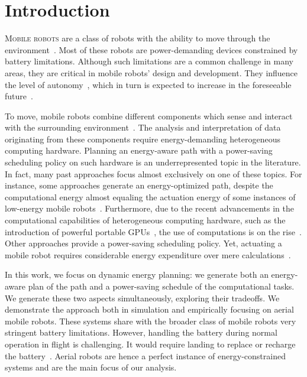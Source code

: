 
\chapter{Introduction}
\label{cp:intro}


\lettrine{M}{obile robots} are a class of robots with the ability to move through the environment~\citep{corke2017robotics}. Most of these robots are power-demanding devices constrained by battery limitations. Although such limitations are a common challenge in many areas, they are critical in mobile robots' design and development. They influence the level of autonomy~\citep{seewald2020mechanical}, which in turn is expected to increase in the foreseeable future~\citep{fisher2013verifying}.

To move, mobile robots combine different components which sense and interact with the surrounding environment~\citep{mei2006deployment}. The analysis and interpretation of data originating from these components require energy-demanding heterogeneous computing hardware. Planning an energy-aware path with a power-saving scheduling policy on such hardware is an underrepresented topic in the literature. In fact, many past approaches focus almost exclusively on one of these topics. For instance, some approaches generate an energy-optimized path, despite the computational energy almost equaling the actuation energy of some instances of low-energy mobile robots~\citep{sudhakar2020balancing}. Furthermore, due to the recent advancements in the computational capabilities of heterogeneous computing hardware, such as the introduction of powerful portable GPUs~\citep{rizvi2017general}, the use of computations is on the rise~\citep{abramov2012real,satria2016real,jaramillo2019visual}. Other approaches provide a power-saving scheduling policy. Yet, actuating a mobile robot requires considerable energy expenditure over mere calculations~\citep{mei2004energy,mei2005case}.

In this work, we focus on dynamic energy planning: we generate both an energy-aware plan of the path and a power-saving schedule of the computational tasks. We generate these two aspects simultaneously, exploring their tradeoffs. We demonstrate the approach both in simulation and empirically focusing on aerial mobile robots. These systems share with the broader class of mobile robots very stringent battery limitations. However, handling the battery during normal operation in flight is challenging. It would require landing to replace or recharge the battery~\citep{zamanakos2020energy}. Aerial robots are hence a perfect instance of energy-constrained systems and are the main focus of our analysis.

